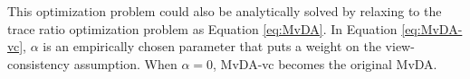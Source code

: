         This optimization problem could also be analytically solved by relaxing to the trace ratio optimization problem as Equation \eqref{eq:MvDA}.
        In Equation \eqref{eq:MvDA-vc}, $\alpha$ is an empirically chosen parameter that puts a weight on the view-consistency assumption.
        When $\alpha = 0$, MvDA-vc becomes the original MvDA. 
